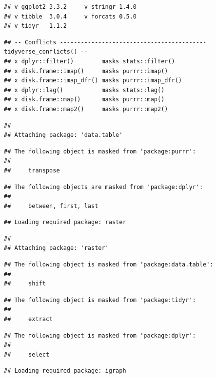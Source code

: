 \documentclass[]{elsarticle} %
\begin{document}
\begin{verbatim}
## v ggplot2 3.3.2     v stringr 1.4.0
## v tibble  3.0.4     v forcats 0.5.0
## v tidyr   1.1.2
\end{verbatim}

\begin{verbatim}
## -- Conflicts ------------------------------------------ tidyverse_conflicts() --
## x dplyr::filter()        masks stats::filter()
## x disk.frame::imap()     masks purrr::imap()
## x disk.frame::imap_dfr() masks purrr::imap_dfr()
## x dplyr::lag()           masks stats::lag()
## x disk.frame::map()      masks purrr::map()
## x disk.frame::map2()     masks purrr::map2()
\end{verbatim}

\begin{verbatim}
## 
## Attaching package: 'data.table'
\end{verbatim}

\begin{verbatim}
## The following object is masked from 'package:purrr':
## 
##     transpose
\end{verbatim}

\begin{verbatim}
## The following objects are masked from 'package:dplyr':
## 
##     between, first, last
\end{verbatim}

\begin{verbatim}
## Loading required package: raster
\end{verbatim}

\begin{verbatim}
## 
## Attaching package: 'raster'
\end{verbatim}

\begin{verbatim}
## The following object is masked from 'package:data.table':
## 
##     shift
\end{verbatim}

\begin{verbatim}
## The following object is masked from 'package:tidyr':
## 
##     extract
\end{verbatim}

\begin{verbatim}
## The following object is masked from 'package:dplyr':
## 
##     select
\end{verbatim}

\begin{verbatim}
## Loading required package: igraph
\end{verbatim}
\end{document}
